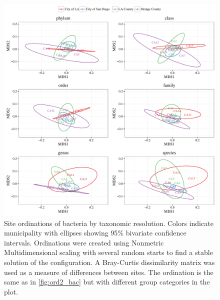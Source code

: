 \documentclass[letterpaper,12pt]{article}\usepackage[]{graphicx}\usepackage[]{color}
\newenvironment{knitrout}{}{} %
\begin{document}
\begin{knitrout}
\color{fgcolor}\begin{figure}[!ht]

{\centering \includegraphics[width=\textwidth]{figs/ord1_bac-1} 

}

\caption{Site ordinations of bacteria by taxonomic resolution.  Colors indicate municipality with ellipses showing 95\% bivariate confidence intervals.  Ordinations were created using Nonmetric Multidimensional scaling with several random starts to find a stable solution of the configuration.  A Bray-Curtis dissimilarity matrix was used as a measure of differences between sites. The ordination is the same as in \cref{fig:ord2_bac} but with different group categories in the plot.}\label{fig:ord1_bac}
\end{figure}


\end{knitrout}
\end{document}
